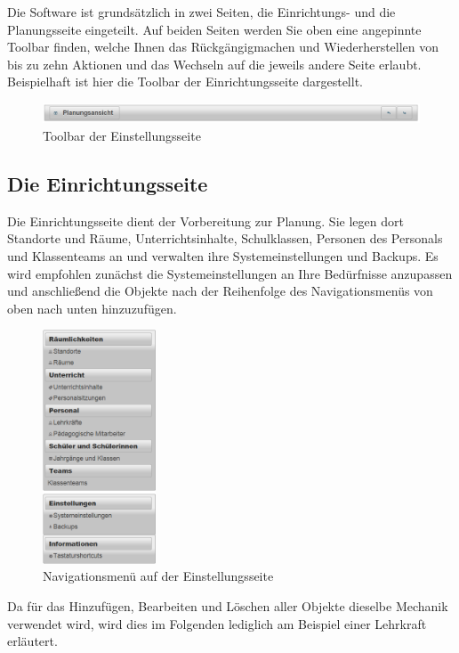 \documentclass[fontsize=12pt]{scrartcl}
\begin{document}
Die Software ist grundsätzlich in zwei Seiten, die Einrichtungs- und die Planungsseite eingeteilt. Auf beiden Seiten werden Sie oben eine angepinnte Toolbar finden, welche Ihnen das Rückgängigmachen und Wiederherstellen von bis zu zehn Aktionen und das Wechseln auf die jeweils andere Seite erlaubt. Beispielhaft ist hier die Toolbar der Einrichtungsseite dargestellt.

\begin{figure}[H]
\includegraphics[width=\textwidth]{images/bar.png}
\caption{Toolbar der Einstellungsseite}
\end{figure}

\subsection{Die Einrichtungsseite}
Die Einrichtungsseite dient der Vorbereitung zur Planung. Sie legen dort Standorte und Räume, Unterrichtsinhalte, Schulklassen, Personen des Personals und Klassenteams an und verwalten ihre Systemeinstellungen und Backups. Es wird empfohlen zunächst die Systemeinstellungen an Ihre Bedürfnisse anzupassen und anschließend die Objekte nach der Reihenfolge des Navigationsmenüs von oben nach unten hinzuzufügen.
\begin{figure}[H]
\centering
\includegraphics[width=0.3\textwidth]{images/navigationMenu.png}
\caption{Navigationsmenü auf der Einstellungsseite}
\end{figure}

Da für das Hinzufügen, Bearbeiten und Löschen aller Objekte dieselbe Mechanik verwendet wird, wird dies im Folgenden lediglich am Beispiel einer Lehrkraft erläutert.
\end{document}
